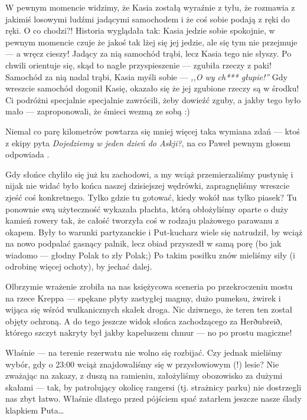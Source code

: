 
W pewnym momencie widzimy, że Kasia zostałą wyraźnie z tyłu, że rozmawia z jakimiś losowymi ludźmi jadącymi samochodem i że coś sobie podają z ręki do ręki. O co chodzi?! Historia wyglądała tak: Kasia jedzie sobie spokojnie, w pewnym momencie czuje że jakoś tak lżej się jej jedzie, ale się tym nie przejmuje --- a wręcz cieszy! Jadący za nią samochód trąbi, lecz Kasia tego nie słyszy. Po chwili orientuje się, skąd to nagłe przyspieszenie --- zgubiła rzeczy z paki! Samochód za nią nadal trąbi, Kasia myśli sobie --- \emph{,,O wy ch*** głupie!''} Gdy wreszcie samochód dogonił Kasię, okazało się że jej zgubione rzeczy są w środku! Ci podróżni specjalnie specjalnie zawrócili, żeby dowieźć zguby, a jakby tego było mało --- zaproponowali, że śmieci wezmą ze sobą :)

Niemal co parę kilometrów powtarza się mniej więcej taka wymiana zdań --- ktoś z ekipy pyta \emph{Dojedziemy w jeden dzień do Askji?}, na co Paweł pewnym głosem odpowiada .


Gdy słońce chyliło się już ku zachodowi, a my wciąż przemierzaliśmy pustynię i nijak nie widać było końca naszej dzisiejszej wędrówki, zapragnęliśmy wreszcie zjeść coś konkretnego. Tylko gdzie tu gotować, kiedy wokół nas tylko piasek? Tu ponownie swą użyteczność wykazała płachta, którą obłożyliśmy oparte o duży kamień rowery tak, że całość tworzyła coś w rodzaju plażowego parawanu z okapem. Były to warunki partyzanckie i Put-kucharz wiele się natrudził, by wciąż na nowo podpalać gasnący palnik, lecz obiad przyszedł w samą porę (bo jak wiadomo --- głodny Polak to zły Polak;) Po takim posiłku znów mieliśmy siły (i odrobinę więcej ochoty), by jechać dalej.

Olbrzymie wrażenie zrobiła na nas księżycowa sceneria po przekroczeniu mostu na rzece Kreppa --- spękane płyty zastygłej magmy, dużo pumeksu, żwirek i wijąca się wśród wulkanicznych skałek droga. Nic dziwnego, że teren ten został objęty ochroną. A do tego jeszcze widok słońca zachodzącego za Herðubreið, którego szczyt nakryty był jakby kapeluszem chmur --- no po prostu magiczne!

Właśnie --- na terenie rezerwatu nie wolno się rozbijać. Czy jednak mieliśmy wybór, gdy o 23:00 wciąż znajdowaliśmy się w przysłowiowym (!) lesie? Nie zważając na zakazy, z duszą na ramieniu, założyliśmy obozowisko za dużymi skałami --- tak, by patrolujący okolicę rangersi (tj. strażnicy parku) nie dostrzegli nas zbyt łatwo. Właśnie dlatego przed pójściem spać zatarłem jeszcze nasze ślady klapkiem Puta…

